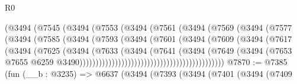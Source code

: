 \begin{lexlean}{R0}
\begin{coremodule}
                                  (@3494
                                    (@7545
                                      (@3494
                                        (@7553
                                          (@3494
                                            (@7561
                                              (@3494
                                                (@7569
                                                  (@3494
                                                    (@7577
                                                      (@3494
                                                        (@7585
                                                          (@3494
                                                            (@7593
                                                              (@3494
                                                                (@7601
                                                                  (@3494
                                                                    (@7609
                                                                      (@3494
                                                                        (@7617
                                                                          (@3494
                                                                            (@7625
                                                                              (@3494
                                                                                (@7633
                                                                                  (@3494
                                                                                    (@7641
                                                                                      (@3494
                                                                                        (@7649
                                                                                          (@3494
                                                                                            (@7653
                                                                                              @7655
                                                                                              @6259
                                                                                              @3490)))))))))))))))))))))))))))))))))))))))))))))
@7870 := @7385
    (fun (__b : @3235) =>
    @6637
      (@3494
        (@7393
          (@3494
            (@7401
              (@3494
                (@7409

\end{coremodule}
\end{lexlean}

